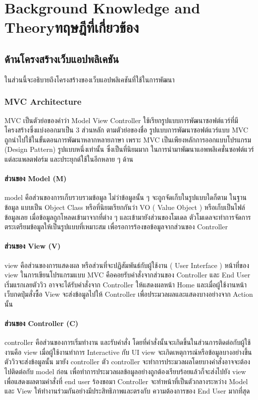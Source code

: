 \chapter{\ifenglish Background Knowledge and Theory\else ทฤษฎีที่เกี่ยวข้อง\fi}


\section{ด้านโครงสร้างเว็บแอปพลิเคชัน}
ในส่วนนี้จะอธิบายถึงโครงสร้างของเว็บแอปพลิเคชันที่ใช้ในการพัฒนา

\subsection{MVC Architecture}
MVC \cite{web:codebee} เป็นตัวย่อของคำว่า Model View Controller ใช้เรียกรูปแบบการพัฒนาซอฟต์แวร์ที่มีโครงสร้างซึ่งแบ่งออกมาเป็น 3 ส่วนหลัก ตามตัวย่อของชื่อ รูปแบบการพัฒนาซอฟต์แวร์แบบ MVC ถูกนำไปใช้ในขั้นตอนการพัฒนาหลากหลายภาษา
เพราะ MVC เป็นเพียงหลักการออกแบบโปรแกรม (Design Pattern) รูปแบบหนึ่งเท่านั้น ซึ่งเป็นที่นิยมมาก
ในการนำมาพัฒนาแอพพลิเคชั่นซอฟต์แวร์แต่ละแพลตฟอร์ม และประยุกต์ใช้ในอีกหลาย ๆ ด้าน
\subsubsection{ส่วนของ Model (M)}
model คือส่วนของการเก็บรวบรวมข้อมูล ไม่ว่าข้อมูลนั้น ๆ จะถูกจัดเก็บในรูปแบบใดก็ตาม ในฐานข้อมูล
แบบเป็น Object Class หรือที่นิยมเรียกกันว่า VO ( Value Object ) หรือเก็บเป็นไฟล์ข้อมูลเลย
เมื่อข้อมูลถูกโหลดเข้ามาจากที่ต่าง ๆ และเข้ามายังส่วนของโมเดล ตัวโมเดลจะทำการจัดการตระเตรียมข้อมูลให้เป็นรูปแบบที่เหมาะสม เพื่อรอการร้องขอข้อมูลจากส่วนของ Controller
\subsubsection{ส่วนของ View (V)}
view คือส่วนของการแสดงผล หรือส่วนที่จะปฏิสัมพันธ์กับผู้ใช้งาน ( User Interface ) หน้าที่ของ view
ในการเขียนโปรแกรมแบบ MVC คือคอยรับคำสั่งจากส่วนของ Controller และ End User เริ่มแรกเลยตัววิว
อาจจะได้รับคำสั่งจาก Controller ให้แสดงผลหน้า Home และเมื่อผู้ใช้งานหน้าเว็บกดปุ่มสั่งซื้อ View จะส่งข้อมูลไปให้ Controller เพื่อประมวลผลและแสดงบางอย่างจาก Action นั้น
\subsubsection{ส่วนของ Controller (C)}
controller คือส่วนของการเริ่มทำงาน และรับคำสั่ง โดยที่คำสั่งนั้นจะเกิดขึ้นในส่วนการติดต่อกับผู้ใช้งานคือ view
เมื่อผู้ใช้งานทำการ Interactive กับ UI view จะเกิดเหตุการณ์หรือข้อมูลบางอย่างขึ้น ตัววิวจะส่งข้อมูลนั้น
มายัง controller ตัว controller จะทำการประมวลผลโดยบางคำสั่งอาจจะต้องไปติดต่อกับ model ก่อน
เพื่อทำการประมวลผลข้อมูลอย่างถูกต้องเรียบร้อยแล้วก็จะส่งไปยัง view เพื่อแสดงผลตามคำสั่งที่ end user ร้องขอมา
Controller จะทำหน้าที่เป็นตัวกลางระหว่าง Model และ View ให้ทำงานร่วมกันอย่างมีประสิทธิภาพและตรงกับ
ความต้องการของ End User มากที่สุด

